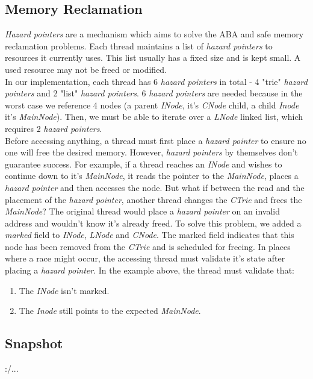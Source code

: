 \documentclass[conference]{IEEEtran}
\begin{document}
\subsection{Memory Reclamation}
	\textit{Hazard pointers} are a mechanism which aims to solve the ABA and safe memory reclamation problems\cite{hazard}\cite{wiki-hazard}. Each thread maintains a list of \textit{hazard pointers} to resources it currently uses. This list usually has a fixed size and is kept small. A used resource may not be freed or modified.\\
	In our implementation, each thread has 6 \textit{hazard pointers} in total - 4 "trie" \textit{hazard pointers} and 2 "list" \textit{hazard pointers}. 6 \textit{hazard pointers} are needed because in the worst case we reference 4 nodes (a parent \textit{INode}, it's \textit{CNode} child, a child \textit{Inode} it's \textit{MainNode}). Then, we must be able to iterate over a \textit{LNode} linked list, which requires 2 \textit{hazard pointers}. \\
	Before accessing anything, a thread must first place a \textit{hazard pointer} to ensure no one will free the desired memory. However, \textit{hazard pointers} by themselves don't guarantee success. For example, if a thread reaches an \textit{INode} and wishes to continue down to it's \textit{MainNode}, it reads the pointer to the \textit{MainNode}, places a \textit{hazard pointer} and then accesses the node. But what if between the read and the placement of the \textit{hazard pointer}, another thread changes the \textit{CTrie} and frees the \textit{MainNode}? The original thread would place a \textit{hazard pointer} on an invalid address and wouldn't know it's already freed. To solve this problem, we added a \textit{marked} field to \textit{INode}, \textit{LNode} and \textit{CNode}. The marked field indicates that this node has been removed from the \textit{CTrie} and is scheduled for freeing. In places where a race might occur, the accessing thread must validate it's state after placing a \textit{hazard pointer}. In the example above, the thread must validate that:
	\begin{enumerate}
		\item The \textit{INode} isn't marked.
		\item The \textit{Inode} still points to the expected \textit{MainNode}.		
	\end{enumerate}
	
\subsection{Snapshot}
	:/...
\end{document}
